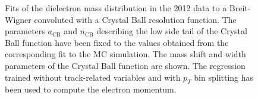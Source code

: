 \documentclass{cmspaper}
\begin{document}
\begin{figure}[h]
\centering
	\caption{Fits of the dielectron mass distribution in the 2012 data to
        a Breit-Wigner convoluted with a Crystal Ball resolution function. The parameters $a_{\mathrm{CB}}$ 
        and $n_{\mathrm{CB}}$ describing the low side tail of the Crystal Ball function have been fixed to the values
        obtained from the corresponding fit to the MC simulation. The mass shift and width parameters 
        of the Crystal Ball function are shown. The regression trained without track-related variables
        and with $p_{T}$ bin splitting has been used to compute the electron momentum.}
	\label{fig:ZMassFit_2012Data_Regression3}
\end{figure}

\clearpage
\end{document}
